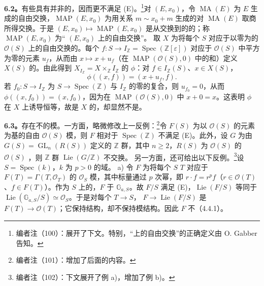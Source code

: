 \textbf{6.2。}有些具有并非的，因而更不满足 (E)。\footnote{编者注（100）：展开了下文。特别，“上的自由交换”的正确定义由 O. Gabber 告知。}对 $(E,x_0)$，令 $\operatorname{MA}(E)$ 为 $E$ 生成的自由交换，$\operatorname{MAP}(E,x_0)$ 为用关系 $m\sim x_0+m$ 生成的对 $\operatorname{MA}(E)$ 取商所得交换。于是 $(E,x_0)\mapsto\operatorname{MAP}(E,x_0)$ 是从交换到的的；称 $\operatorname{MAP}(E,x_0)$ 为“ $(E,x_0)$ 上的自由交换”。
取 $X$ 为将每个 $S$ 对应于以零为的 $\mathcal O(S)$ 上的自由交换的。每个 $f:S\to I_{\mathbb Z}=\operatorname{Spec}(\mathbb Z[\varepsilon])$ 对应于 $\mathcal O(S)$ 中平方为零的元素 $u_f$，从而由 $x\mapsto x+u_f$（在 $\operatorname{MAP}(\mathcal O(S),0)$ 中的和）定义 $X(S)$ 的。由此得到 $X_{I_{\mathbb Z}}=X\times_{\mathbb Z}I_{\mathbb Z}$ 的 $\phi$：对 $f\in I_{\mathbb Z}(S)$、$x\in X(S)$，
\[\phi((x,f))=(x+u_f,f).\]
若 $f_0:S\to I_{\mathbb Z}$ 为 $S\to\operatorname{Spec}(\mathbb Z)$ 与 $I_{\mathbb Z}$ 的零的复合，则 $u_{f_0}=0$，从而 $\phi((x,f_0))=(x,f_0)$，因为在 $\operatorname{MAP}(\mathcal O(S),0)$ 中 $x+0=x$。这表明 $\phi$ 在 $X$ 上诱导恒等，故是 $X$ 的，却显然不是。

\textbf{6.3。}存在不的模。一方面，略微修改上一反例：\footnote{编者注（101）：增加了后面的内容。}令 $F(S)$ 为以 $\mathcal O(S)$ 的元素为基的自由 $\mathcal O(S)$ 模，则 $F$ 相对于 $\operatorname{Spec}(\mathbb Z)$ 不满足 (E)。此外，设 $G$ 为由 $G(S)=\operatorname{GL}_n(R(S))$ 定义的 $\mathbb Z$ 群，其中 $n\geq2$，$R(S)$ 为 $\mathcal O(S)$ 的 $\mathcal O(S)$ ，则 $\mathbb Z$ 群 $\operatorname{Lie}(G/\mathbb Z)$ 不交换。
另一方面，还可给出以下反例。\footnote{编者注（102）：下文展开了例 a)，增加了例 b)。}设 $S=\operatorname{Spec}(k)$，$k$ 为 $p>0$ 的域。
a) 令 $F$ 为将每个 $S$  $T$ 对应于 $F(T)=\Gamma(T,\mathcal O_T)$ 的 $\mathcal O_S$ 模，其中标量通过 $p$ 次幂，即 $r\cdot f=r^pf$（$r\in\mathcal O(T)$、$f\in F(T)$）。作为 $S$ 上的，$F$ 于 $\mathbb G_{a,S}$。故 $F/S$ 满足 (E)，$\operatorname{Lie}(F/S)$ 等同于 $\operatorname{Lie}(\mathbb G_{a,S}/S)\simeq\mathcal O_S$。于是对每个 $T\to S$， $F\to\operatorname{Lie}(F/S)$ 是
 $F(T)\to\mathcal O(T)$；它保持结构，却不保持模结构。因此 $F$ 不（4.4.1）。

